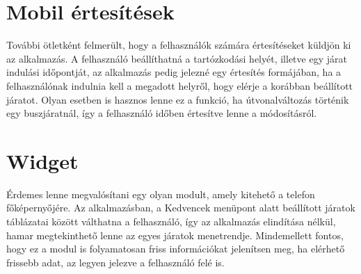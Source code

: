 \section*{Mobil értesítések}
\label{pushnot}
További ötletként felmerült, hogy a felhasználók számára értesítéseket küldjön ki az alkalmazás.
A felhasználó beállíthatná a tartózkodási helyét, illetve egy járat indulási időpontját, az alkalmazás pedig jelezné egy értesítés formájában, ha a felhasználónak indulnia kell a megadott helyről, hogy elérje a korábban beállított járatot.
Olyan esetben is hasznos lenne ez a funkció, ha útvonalváltozás történik egy buszjáratnál, így a felhasználó időben értesítve lenne a módosításról.

\section*{Widget}
\label{widget}
Érdemes lenne megvalósítani egy olyan modult, amely kitehető a telefon főképernyőjére.
Az alkalmazásban, a Kedvencek menüpont alatt beállított járatok táblázatai között válthatna a felhasználó, így az alkalmazás elindítása nélkül, hamar megtekinthető lenne az egyes járatok menetrendje.
Mindemellett fontos, hogy ez a modul is folyamatosan friss információkat jelenítsen meg, ha elérhető frissebb adat, az legyen jelezve a felhasználó felé is.
\newpage